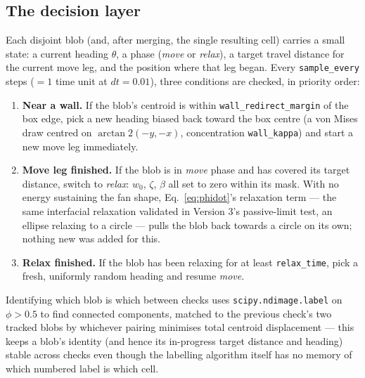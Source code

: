 \documentclass[11pt]{article}
\begin{document}
\subsection{The decision layer}
\label{sec:decision}
Each disjoint blob (and, after merging, the single resulting cell)
carries a small state: a current heading $\theta$, a phase (\emph{move}
or \emph{relax}), a target travel distance for the current move leg,
and the position where that leg began. Every \texttt{sample\_every}
steps ($=1$ time unit at $dt=0.01$), three conditions are checked, in
priority order:
\begin{enumerate}
\item \textbf{Near a wall.} If the blob's centroid is within
\texttt{wall\_redirect\_margin} of the box edge, pick a new heading
biased back toward the box centre (a von Mises draw centred on
$\arctan2(-y,-x)$, concentration \texttt{wall\_kappa}) and start a new
move leg immediately.
\item \textbf{Move leg finished.} If the blob is in \emph{move} phase
and has covered its target distance, switch to \emph{relax}: $w_0$,
$\zeta$, $\beta$ all set to zero within its mask. With no energy
sustaining the fan shape, Eq.~\eqref{eq:phidot}'s relaxation term
— the same interfacial relaxation validated in Version 3's
passive-limit test, an ellipse relaxing to a circle — pulls the blob
back towards a circle on its own; nothing new was added for this.
\item \textbf{Relax finished.} If the blob has been relaxing for at
least \texttt{relax\_time}, pick a fresh, uniformly random heading
and resume \emph{move}.
\end{enumerate}
Identifying which blob is which between checks uses
\texttt{scipy.ndimage.label} on $\phi>0.5$ to find connected
components, matched to the previous check's two tracked blobs by
whichever pairing minimises total centroid displacement — this keeps
a blob's identity (and hence its in-progress target distance and
heading) stable across checks even though the labelling algorithm
itself has no memory of which numbered label is which cell.
\end{document}
